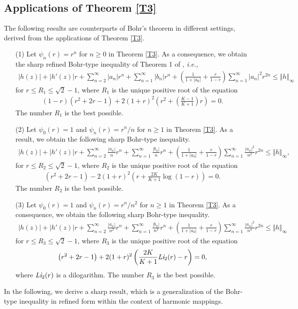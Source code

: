 \documentclass[11pt,reqno]{amsart}
\newtheorem{open problem}{Open problem}[section]
\newcommand{\beas}{\begin{eqnarray*}}
\newcommand{\eeas}{\end{eqnarray*}}
\numberwithin{equation}{section}
\begin{document}
\subsection{Applications of \textrm{Theorem \ref{T3}}}
The following results are counterparts of Bohr's theorem in different settings, derived from the applications of \textrm{Theorem \ref{T3}}.
\begin{itemize}
\item[(1)] Let $\psi_n(r)=r^n$ for $n\geq 0$ in \textrm{Theorem \ref{T3}}. As a consequence, we obtain the sharp refined Bohr-type inequality of \textrm{Theorem 1} of  \cite{KPS2018}, {\it i.e.,} 
\beas |h(z)|+|h'(z)|r+\sum_{n=2}^\infty |a_n| r^n+\sum_{n=1}^\infty |b_n| r^n+\left(\frac{1}{1+|a_0|}+\frac{r}{1-r}\right)\sum_{n=1}^\infty |a_n|^2 r^{2n}\leq \Vert h\Vert_\infty\eeas
for $r\leq R_1\leq \sqrt{2}-1$, where $R_1$ is the unique positive root of the equation
\beas (1-r)\left(r^2+2r-1\right)+2(1+r)^2\left(r^2+\left(\frac{K-1}{K+1}\right)r\right)=0.\eeas 
The number $R_1$ is the best possible.
\item[(2)] Let $\psi_0(r)=1$ and $\psi_n(r)=r^n/n$ for $n\geq 1$ in \textrm{Theorem \ref{T3}}. As a result, we obtain the following sharp Bohr-type inequality.
\beas |h(z)|+|h'(z)|r+\sum_{n=2}^\infty \frac{|a_n|}{n}r^n+\sum_{n=1}^\infty \frac{|b_n|}{n}r^n+\left(\frac{1}{1+|a_0|}+\frac{r}{1-r}\right)\sum_{n=1}^\infty \frac{|a_n|^2}{n^2} r^{2n}\leq \Vert h\Vert_\infty,\eeas
for $r\leq R_2\leq \sqrt{2}-1$, where $R_2$ is the unique positive root of the equation
\beas\left(r^2+2r-1\right)-2(1+r)^2\left(r+\frac{2K}{K+1}\log(1-r)\right)=0.\eeas 
The number $R_2$ is the best possible.
\item[(3)] Let $\psi_0(r)=1$ and $\psi_n(r)=r^n/n^2$ for $n\geq 1$ in \textrm{Theorem \ref{T3}}. As a consequence, we obtain the following sharp Bohr-type inequality.
\beas |h(z)|+|h'(z)|r+\sum_{n=2}^\infty \frac{|a_n|}{n^2}r^n+\sum_{n=1}^\infty \frac{|b_n|}{n^2}r^n+\left(\frac{1}{1+|a_0|}+\frac{r}{1-r}\right)\sum_{n=1}^\infty \frac{|a_n|^2}{n^4} r^{2n}\leq \Vert h\Vert_\infty\eeas
for $r\leq R_3\leq \sqrt{2}-1$, where $R_3$ is the unique positive root of the equation
\beas\left(r^2+2r-1\right)+2(1+r)^2\left(\frac{2K}{K+1}\text{\it Li}_2(r)-r\right)=0,\eeas 
where $\text{\it Li}_2(r)$ is a dilogarithm. The number $R_3$ is the best possible.
\end{itemize}
In the following, we derive a sharp result, which is a generalization of the Bohr-type inequality in refined form within the context of harmonic mappings.
\end{document}
